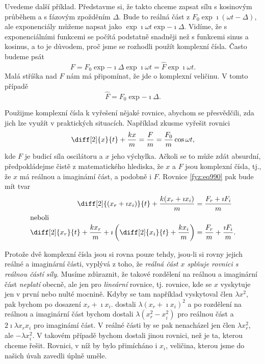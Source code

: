     Uvedeme další příklad. Představme si, že takto chceme zapsat sílu s kosinovým průběhem a s
    fázovým zpožděním \(\Delta\). Bude to reálná část z \(F_0\exp{\imath(\omega t-\Delta)}\), ale
    exponenciály můžeme napsat jako \(\exp{\imath\omega t}\exp{-\imath\Delta}\). Vidíme, že s
    exponenciálními funkcemi se počítá podstatně snadněji než s funkcemi sinus a kosinus, a to je
    důvodem, proč jsme se rozhodli použít komplexní čísla. Často budeme psát
    \begin{equation}\label{fyz:eq989}
      F=F_0\exp{-\imath\Delta}\exp{\imath\omega t}=\hat{F}\exp{\imath\omega t}.
    \end{equation}
    Malá stříška nad \(F\) nám má připomínat, že jde o komplexní veličinu. V tomto případě
    \begin{equation*}
      \hat{F} = F_0\exp{-\imath\Delta}.
    \end{equation*}

    Použijme komplexní čísla k vyřešení nějaké rovnice, abychom se přesvědčili, zda jich lze využít
    v praktických situacích. Například zkusme vyřešit rovnici
    \begin{equation}\label{fyz:eq990}
      \diff[2]{x}{t}+\frac{kx}{m}=\frac{F}{m}=\frac{F_0}{m}\cos\omega t,
    \end{equation}
    kde \(F\) je budicí síla oscilátoru a \(x\) jeho výchylka. Ačkoli se to může zdát absurdní,
    předpokládejme čistě z matematického hlediska, že \(x\) a \(F\) jsou komplexní čísla, tj., že
    \(x\) má reálnou a imaginámí část, a podobně i \(F\). Rovnice \eqref{fyz:eq990} pak bude mít
    tvar
    \begin{align*}
      \diff[2]{(x_r+\imath x_i)}{t}+\frac{k(x_r+\imath x_i)}{m} 
        &= \frac{F_r+\imath F_i}{m}   \\
      \shortintertext{neboli}
      \diff[2]{x_r}{t}+\frac{kx_r}{m}+\imath\left(\diff[2]{x_i}{t}+\frac{kx_i}{m}\right) 
        &= \frac{F_r}{m}+\frac{\imath F_i}{m}.
    \end{align*}

    Protože dvě komplexní čísla jsou si rovna pouze tehdy, jsou-li si rovny jejich reálné a
    imaginární části, vyplývá z toho, že \emph{reálná část \(x\) splňuje rovnici s reálnou částí
    síly}. Musíme zdůraznit, že takové rozdělení na reálnou a imaginární část \emph{neplatí} obecně,
    ale jen pro \emph{lineární} rovnice, tj. rovnice, kde se \(x\) vyskytuje jen v první nebo nulté
    mocnině. Kdyby se tam například vyskytoval člen \(\lambda x^2\), pak bychom po dosazení \(x_r +
    \imath x_i\). dostali \(\lambda(x_r + \imath x_i)^2\) a po rozdělení na reálnou a imaginární
    část bychom dostali \(\lambda(x_r^2 - x_i^2)\) pro reálnou část a \(2\imath\lambda x_rx_i\) pro
    imaginámí část. V reálné části by se pak nenacházel jen člen \(\lambda x_r^2\), ale \(-\lambda
    x_i^2\). V takovém případě bychom dostali jinou rovnici, než je ta, kterou chceme řešit.
    Rovnici, v níž by bylo přimícháno i \(x_i\), veličina, kterou jsme do našich úvah zavedli úplně
    uměle.

